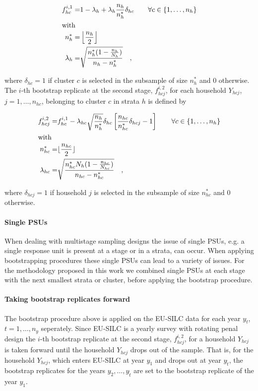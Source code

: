 \documentclass{scrartcl}
\begin{document}
\begin{align*}
  f^{i,1}_{hc} =& 1-\lambda_h+\lambda_h\frac{n_h}{n_h^*}\delta_{hc} \quad\quad \forall c \in \{1,\ldots,n_h\} \\
  \intertext{with}
  n_h^* =& \left\lfloor\frac{n_h}{2}\right\rfloor \\
  \lambda_h =& \sqrt{\frac{n_h^*(1-\frac{n_h}{N_h})}{n_h-n_h^*}} \quad ,
\end{align*}

where $\delta_{hc}=1$ if cluster $c$ is selected in the subsample of size $n_h^*$ and 0 otherwise.\\
\noindent
The $i$-th bootstrap replicate at the second stage, $f^{i,2}_{hcj}$, for each household $Y_{hcj}$, $j=1,\ldots,n_{hc}$, belonging to cluster $c$ in strata $h$ is defined by

\begin{align*}
  f^{i,2}_{hcj} =& f^{i,1}_{hc} - \lambda_{hc}\sqrt{\frac{n_h}{n_h^*}}\delta_{hc}\left[\frac{n_{hc}}{n_{hc}^*}\delta_{hcj}-1\right] \quad\quad \forall c \in \{1,\ldots,n_h\}\\
  \intertext{with}
  n_{hc}^* =& \lfloor\frac{n_{hc}}{2}\rfloor \\
  \lambda_{hc} =& \sqrt{\frac{n_{hc}^*N_h(1-\frac{n_{hc}}{N_{hc}})}{n_{hc}-n_{hc}^*}} \quad ,
\end{align*}

where $\delta_{hcj}=1$ if household $j$ is selected in the subsample of size $n_{hc}^*$ and 0 otherwise.\\

\paragraph{Single PSUs}
When dealing with multistage sampling designs the issue of single PSUs, e.g. a single response unit is present at a stage or in a strata, can occur. When applying bootstrapping procedures these single PSUs can lead to a variety of issues. For the methodology proposed in this work we combined single PSUs at each stage with the next smallest strata or cluster, before applying the bootstrap procedure.

\paragraph{Taking bootstrap replicates forward}
The bootstrap procedure above is applied on the EU-SILC data for each year $y_t$, $t=1,\ldots,n_y$ seperately. Since EU-SILC is a yearly survey with rotating penal design the $i$-th bootstrap replicate at the second stage, $f^{i,2}_{hcj}$, for a household $Y_{hcj}$ is taken forward until the household $Y_{hcj}$ drops out of the sample. That is, for the household $Y_{hcj}$, which enters EU-SILC at year $y_1$ and drops out at year $y_{\tilde{t}}$, the bootstrap replicates for the years $y_2,\ldots,y_{\tilde{t}}$ are set to the bootstrap replicate of the year $y_1$.
\end{document}

